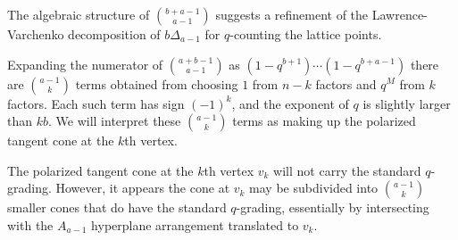\documentclass{amsart}[12pt]
\theoremstyle{definition}
\begin{document}
\subsubsection{}

The algebraic structure of $\binom{b+a-1}{a-1}$ suggests  a refinement of the Lawrence-Varchenko decomposition of $b\Delta_{a-1}$ for $q$-counting the lattice points.

Expanding the numerator of $\binom{a+b-1}{a-1}$ as $(1-q^{b+1})\cdots (1-q^{b+a-1})$ there are $\binom{a-1}{k}$ terms obtained from choosing $1$ from $n-k$ factors and $q^M$ from $k$ factors. Each such term has sign $(-1)^k$, and the exponent of $q$ is slightly larger than $kb$.  We will interpret these $\binom{a-1}{k}$ terms as making up the polarized tangent cone at the $k$th vertex.


The polarized tangent cone at the $k$th vertex $v_k$ will not carry the standard $q$-grading.  However, it appears the cone at $v_k$ may be subdivided into $\binom{a-1}{k}$ smaller cones that do have the standard $q$-grading, essentially by intersecting with the $A_{a-1}$ hyperplane arrangement translated to $v_k$.
\end{document}
